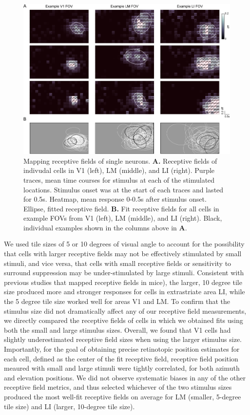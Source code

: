 \begin{figure}[t!]
    \includegraphics[width=\textwidth]{figures/chapter_3/fig_3-2_rf_examples/fig_3-2_rf_examples.pdf}
    \vspace{.1in}
    \caption[Receptive field mapping]{Mapping receptive fields of single neurons. \textbf{A.} Receptive fields of indivudal cells in V1 (left), LM (middle), and LI (right). Purple traces, mean time courses for stimulus at each of the stimulated locations. Stimulus onset was at the start of each traces and lasted for 0.5s. Heatmap, mean response 0-0.5s after stimulus onset. Ellipse, fitted receptive field.
    \textbf{B.} Fit receptive fields for all cells in example FOVs from V1 (left), LM (middle), and LI (right). Black, individual examples shown in the columns above in \textbf{A}.
    \label{fig:rf_examples}}
\end{figure}

We used tile sizes of 5 or 10 degrees of visual angle to account for the possibility that cells with larger receptive fields may not be effectively stimulated by small stimuli, and vice versa, that cells with small receptive fields or sensitivity to surround suppression may be under-stimulated by large stimuli. Consistent with previous studies that mapped receptive fields in mice\cite{DeVries2019}), the larger, 10 degree tile size produced more and stronger responses for cells in extrastriate area LI, while the 5 degree tile size worked well for areas V1 and LM. To confirm that the stimulus size did not dramatically affect any of our receptive field measurements, we directly compared the receptive fields of cells in which we obtained fits using both the small and large stimulus sizes. Overall, we found that V1 cells had slightly underestimated receptive field sizes when using the larger stimulus size. Importantly, for the goal of obtaining precise retinotopic position estimates for each cell, defined as the center of the fit receptive field, receptive field position meaured with small and large stimuli were tightly correlated, for both azimuth and elevation positions. We did not observe systematic biases in any of the other receptive field metrics, and thus selected whichever of the two stimulus sizes produced the most well-fit receptive fields on average for LM (smaller, 5-degree tile size) and LI (larger, 10-degree tile size). 

